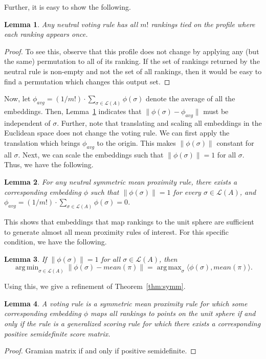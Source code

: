 \documentclass[10pt,letterpaper]{article}
\newcommand{\calL}{{\mathcal{L}}}
\newcommand{\rank}{{\calL(A)}}
\DeclareMathOperator*{\argmax}{arg\,max}
\DeclareMathOperator*{\argmin}{arg\,min}
\newtheorem{lemma}{Lemma}
\begin{document}
Further, it is easy to show the following.
\begin{lemma}
Any neutral voting rule has all $m!$ rankings tied on the profile where each ranking appears once.
\label{lem:average-profile}
\end{lemma}
\begin{proof}
To see this, observe that this profile does not change by applying any (but the same) permutation to all of its ranking. If the set of rankings returned by the neutral rule is non-empty and not the set of all rankings, then it would be easy to find a permutation which changes this output set.
\end{proof}

Now, let $\phi_{avg} = (1/{m!}) \cdot \sum_{\sigma \in \rank} \phi(\sigma)$ denote the average of all the embeddings. Then, Lemma~\ref{lem:average-profile} indicates that $\|\phi(\sigma)-\phi_{avg}\|$ must be independent of $\sigma$. Further, note that translating and scaling all embeddings in the Euclidean space does not change the voting rule. We can first apply the translation which brings $\phi_{avg}$ to the origin. This makes $\|\phi(\sigma)\|$ constant for all $\sigma$. Next, we can scale the embeddings such that $\|\phi(\sigma)\| = 1$ for all $\sigma$. Thus, we have the following.

\begin{lemma}
For any neutral symmetric mean proximity rule, there exists a corresponding embedding $\phi$ such that $\|\phi(\sigma)\| = 1$ for every $\sigma \in \rank$, and $\phi_{avg} = (1/{m!}) \cdot \sum_{\sigma \in \rank} \phi(\sigma) = 0$.
\label{lem:equal-norm}
\end{lemma}

This shows that embeddings that map rankings to the unit sphere are sufficient to generate almost all mean proximity rules of interest. For this specific condition, we have the following.
\begin{lemma}
If $\|\phi(\sigma)\| = 1$ for all $\sigma \in \rank$, then 
$$
\argmin_{\sigma \in \rank} \|\phi(\sigma) - mean(\pi)\| = \argmax_{\sigma} \langle \phi(\sigma), mean(\pi) \rangle.
$$ 
\end{lemma}

Using this, we give a refinement of Theorem~\ref{thm:symm}.
\begin{lemma}
A voting rule is a symmetric mean proximity rule for which some corresponding embedding $\phi$ maps all rankings to points on the unit sphere if and only if the rule is a generalized scoring rule for which there exists a corresponding positive semidefinite score matrix. 
\label{lem:char-psd}
\end{lemma}
\begin{proof}
Gramian matrix if and only if positive semidefinite.
\end{proof}
\end{document}
